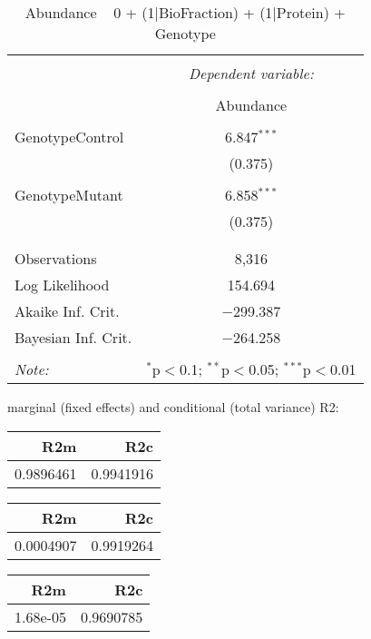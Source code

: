 \documentclass[11pt]{report}
\begin{document}
\begin{table}[!htbp] \centering 
  \caption{Abundance ~ 0 + (1|BioFraction) + (1|Protein) + Genotype} 
  \label{} 
\begin{tabular}{@{\extracolsep{5pt}}lc} 
\\[-1.8ex]\hline 
\hline \\[-1.8ex] 
 & \multicolumn{1}{c}{\textit{Dependent variable:}} \\ 
\cline{2-2} 
\\[-1.8ex] & Abundance \\ 
\hline \\[-1.8ex] 
 GenotypeControl & 6.847$^{***}$ \\ 
  & (0.375) \\ 
  & \\ 
 GenotypeMutant & 6.858$^{***}$ \\ 
  & (0.375) \\ 
  & \\ 
\hline \\[-1.8ex] 
Observations & 8,316 \\ 
Log Likelihood & 154.694 \\ 
Akaike Inf. Crit. & $-$299.387 \\ 
Bayesian Inf. Crit. & $-$264.258 \\ 
\hline 
\hline \\[-1.8ex] 
\textit{Note:}  & \multicolumn{1}{r}{$^{*}$p$<$0.1; $^{**}$p$<$0.05; $^{***}$p$<$0.01} \\ 
\end{tabular} 
\end{table} 
marginal (fixed effects) and conditional (total variance) R2:

\begin{tabular}{r|r}
\hline
R2m & R2c\\
\hline
0.9896461 & 0.9941916\\
\hline
\end{tabular}

\begin{tabular}{r|r}
\hline
R2m & R2c\\
\hline
0.0004907 & 0.9919264\\
\hline
\end{tabular}

\begin{tabular}{r|r}
\hline
R2m & R2c\\
\hline
1.68e-05 & 0.9690785\\
\hline
\end{tabular}
\end{document}
